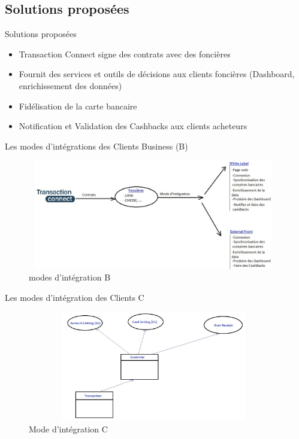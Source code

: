 \documentclass{beamer}
\begin{document}
\subsection{Solutions proposées}
\begin{frame}{Solutions proposées}
\begin{itemize}
		\item Transaction Connect signe des contrats avec des foncières
		\item Fournit des services et outils de décisions aux clients foncières (Dashboard, enrichissement des données)
		\item Fidélisation de la carte bancaire
		\item Notification et Validation des Cashbacks aux clients acheteurs
\end{itemize}
\end{frame}
\begin{frame}{Les modes d'intégrations des Clients Business (B)}
\begin{figure}[H]
    \includegraphics[width=11cm,height=4.8cm]{images/contrat.jpeg}
    \caption{ modes d'intégration B}
    \label{fig:L1}
\end{figure}
\end{frame}
\begin{frame}{Les modes d'intégration des Clients C}
\begin{figure}[H]
    \includegraphics[width=11cm,height=4.8cm]{images/moyen_paiement.jpeg}
    \caption{ Mode d'intégration C}
    \label{fig:L1}
\end{figure}
\end{frame}
\end{document}
